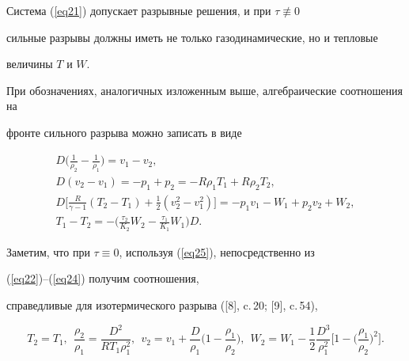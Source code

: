 Система (\ref{eq21}) допускает разрывные решения, и при $\tau\not\equiv0$


сильные разрывы должны иметь не только газодинамические, но и тепловые


величины $T$ и $W$.





При обозначениях, аналогичных изложенным выше, алгебраические соотношения на


фронте сильного разрыва можно записать в виде


\begin{gather}


\label{eq22}


D\bigg(\frac{1}{\rho_2}-\frac{1}{\rho_1}\bigg)=v_1-v_2,\\


\label{eq23}


D(v_2-v_1)=-p_1+p_2=-R\rho_1T_1+R\rho_2T_2,\\


\label{eq24}


D\bigg[\frac{R}{\gamma-1}(T_2-T_1)+\frac{1}{2}(v_2^2-v_1^2)\bigg]=


-p_1v_1-W_1+p_2v_2+W_2,\\


\label{eq25}


T_1-T_2=-\bigg(\frac{\tau_2}{K_2}W_2-\frac{\tau_1}{K_1}W_1\bigg)D.


\end{gather}


Заметим, что при $\tau\equiv0$, используя (\ref{eq25}), непосредственно из


(\ref{eq22})--(\ref{eq24}) получим соотношения, 


справедливые для изотермического разрыва ([8], c.\,20; [9], c.\,54),


$$




T_2=T_1, \ \


\frac{\rho_2}{\rho_1}=\frac{D^2}{RT_1\rho_1^2},\ \


v_2=v_1+\frac{D}{\rho_1}\bigg(1-\frac{\rho_1}{\rho_2}\bigg),\ \


W_2=W_1-\frac{1}{2}\frac{D^3}{\rho_1^2}


\bigg[1-\bigg(\frac{\rho_1}{\rho_2}\bigg)^2\bigg].




$$


